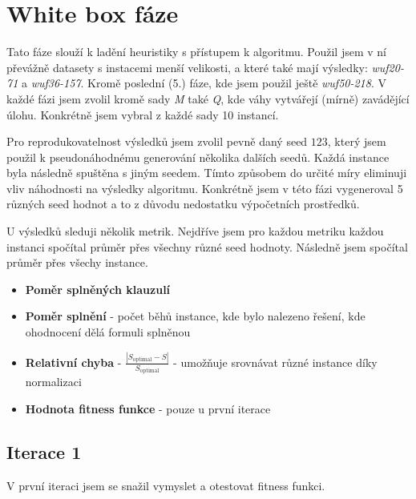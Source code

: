 \documentclass[12pt]{article}
\begin{document}
\newpage
\section{White box fáze}

Tato fáze slouží k ladění heuristiky s přístupem k algoritmu. Použil jsem v ní převážně datasety s instacemi menší velikosti, a které také mají výsledky: \textit{wuf20-71} a \textit{wuf36-157}. Kromě poslední (5.) fáze, kde jsem použil ještě \textit{wuf50-218}. V každé fázi jsem zvolil kromě sady \textit{M} také \textit{Q}, kde váhy vytvářejí (mírně) zavádějící úlohu. Konkrétně jsem vybral z každé sady 10 instancí.

Pro reprodukovatelnost výsledků jsem zvolil pevně daný seed $123$, který jsem použil k pseudonáhodnému generování několika dalších seedů. Každá instance byla následně spuštěna s jiným seedem. Tímto způsobem do určité míry eliminuji vliv náhodnosti na výsledky algoritmu. Konkrétně jsem v této fázi vygeneroval 5 různých seed hodnot a to z důvodu nedostatku výpočetních prostředků. 

U výsledků sleduji několik metrik. Nejdříve jsem pro každou metriku každou instanci spočítal průměr přes všechny různé seed hodnoty. Následně jsem spočítal průměr přes všechy instance.
\begin{itemize}
    \item \textbf{Poměr splněných klauzulí}
    \item \textbf{Poměr splnění} - počet běhů instance, kde bylo nalezeno řešení, kde ohodnocení dělá formuli           splněnou 
    \item \textbf{Relativní chyba} - $\frac{|S_{\text{optimal}} - S|}{S_{\text{optimal}}}$ - umožňuje srovnávat různé   instance díky normalizaci
    \item \textbf{Hodnota fitness funkce} - pouze u první iterace
\end{itemize}

\subsection{Iterace 1}

V první iteraci jsem se snažil vymyslet a otestovat fitness funkci.
\end{document}
